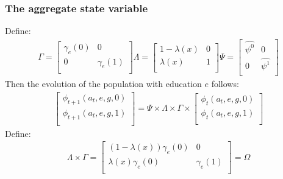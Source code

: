 \documentclass{beamer}
\begin{document}
\begin{frame}
\frametitle{The aggregate state variable }
Define:
\begin{align*}
   \Gamma=
  \left[ {\begin{array}{cc}
   \gamma_{e}(0) & 0 \\
   0 & \gamma_{e}(1) \\
  \end{array} } \right]
   \Lambda=
  \left[ {\begin{array}{cc}
   1-\lambda(x) & 0 \\
   \lambda(x) & 1 \\
  \end{array} } \right]
   \Psi=
  \left[ {\begin{array}{cc}
   \hat{\psi^{0}} & 0 \\
   0 & \hat{\psi^{1}} \\
  \end{array} } \right]
\end{align*}
Then the evolution of the population with education $e$  follows:
\begin{align*}
\left[ {\begin{array}{c}
   \phi_{t+1}(a_{t},e,g,0)\\
   \phi_{t+1}(a_{t},e,g,1)\\
  \end{array} } \right]=\Psi\times \Lambda \times \Gamma\times 
\left[ {\begin{array}{c}
   \phi_{t}(a_{t},e,g,0)\\
   \phi_{t}(a_{t},e,g,1) \\
  \end{array} } \right] 
\end{align*}
Define:
\begin{align*}
\Lambda \times \Gamma=
\left[ {\begin{array}{cc}
   (1-\lambda(x))\gamma_{e}(0)&0\\
   \lambda(x)\gamma_{e}(0)&\gamma_{e}(1)\\
  \end{array} } \right]=\Omega
\end{align*}





\end{frame}
\end{document}
